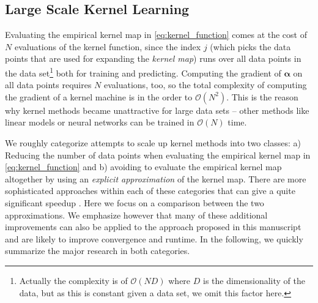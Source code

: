 \documentclass{article} %
\newcommand{\va}{\boldsymbol{\alpha}}
\begin{document}
\subsection{Large Scale Kernel Learning}\label{sec:large_scale_kernel_learning}
Evaluating the empirical kernel map in \autoref{eq:kernel_function} comes at the cost of $N$ evaluations of the kernel function, since the index $j$ (which picks the data points that are used for expanding the {\em kernel map}) runs over all data points in the data set\footnote{Actually the complexity is of $\mathcal{O}(ND)$ where $D$ is the dimensionality of the data, but as this is constant given a data set, we omit this factor here.} both for training and predicting. Computing the gradient of $\va$ on all data points requires $N$ evaluations, too, so the total complexity of computing the gradient of a kernel machine is in the order to $\mathcal{O}(N^2)$. This is the reason why kernel methods became unattractive for large data sets -- other methods like linear models or neural networks can be trained in $\mathcal{O}(N)$ time. 

We roughly categorize attempts to scale up kernel methods into two classes: a) Reducing the number of data points when evaluating the empirical kernel map in \autoref{eq:kernel_function} and b) avoiding to evaluate the empirical kernel map altogether by using an {\em explicit approximation} of the kernel map. There are more sophisticated approaches within each of these categories that can give a quite significant speedup \cite{Le2013, Rudi2015}. Here we focus on a comparison between the two approximations. We emphasize however that many of these additional improvements can also be applied to the approach proposed in this manuscript and are likely to improve convergence and runtime. In the following, we quickly summarize the major research in both categories.
\end{document}
